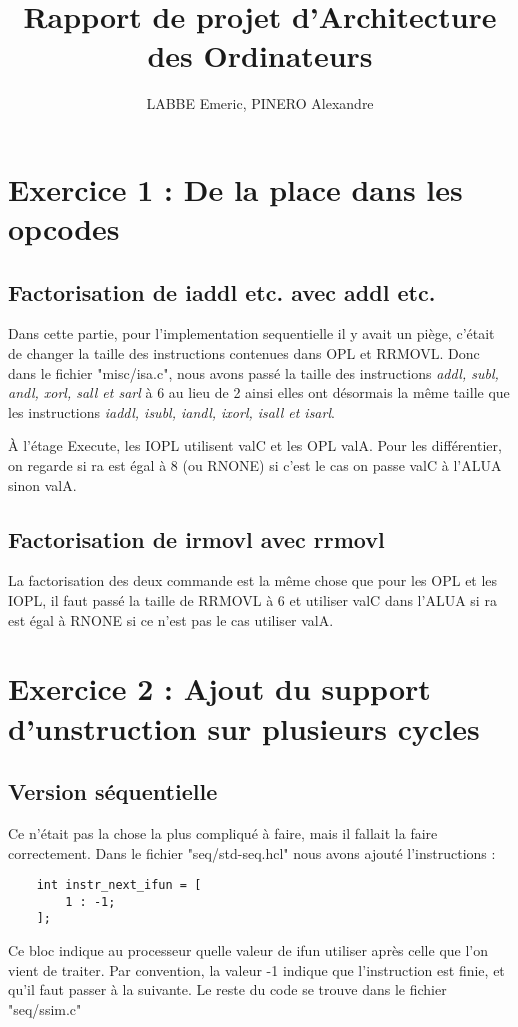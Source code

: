 \documentclass[12pt]{article}
\author{LABBE Emeric, PINERO Alexandre}
\title{Rapport de projet d'Architecture des Ordinateurs}
\begin{document}
\maketitle
\tableofcontents

\newpage
\section{Exercice 1 : De la place dans les opcodes}
\subsection{Factorisation de iaddl etc. avec addl etc.}
Dans cette partie, pour l'implementation sequentielle il y avait un piège, c'était de changer la taille des instructions contenues dans OPL et RRMOVL. Donc dans le fichier "misc/isa.c", nous avons passé la taille des instructions \emph{addl, subl, andl, xorl, sall et sarl} à 6 au lieu de 2 ainsi elles ont désormais la même taille que les instructions \emph{iaddl, isubl, iandl, ixorl, isall et isarl}.\par
\`A l'étage Execute, les IOPL utilisent valC et les OPL valA. Pour les différentier, on regarde si ra est égal à 8 (ou RNONE) si c'est le cas on passe valC à l'ALUA sinon valA.

\subsection{Factorisation de irmovl avec rrmovl}
La factorisation des deux commande est la même chose que pour les OPL et les IOPL, il faut passé la taille de RRMOVL à 6 et utiliser valC dans l'ALUA si ra est égal à RNONE si ce n'est pas le cas utiliser valA.

\newpage
\section{Exercice 2 : Ajout du support d'unstruction sur plusieurs cycles}
\subsection{Version séquentielle}
Ce n'était pas la chose la plus compliqué à faire, mais il fallait la faire correctement. Dans le fichier "seq/std-seq.hcl" nous avons ajouté l'instructions :
\begin{verbatim}
	int instr_next_ifun = [
		1 : -1;
	];
\end{verbatim}
Ce bloc indique au processeur quelle valeur de ifun utiliser après celle que l’on vient de traiter.
Par convention, la valeur -1 indique que l’instruction est finie, et qu’il faut passer à la suivante.
Le reste du code se trouve dans le fichier "seq/ssim.c"
\end{document}

